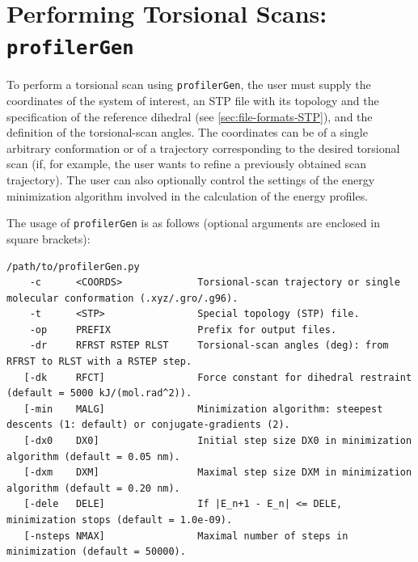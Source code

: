 \documentclass[10pt,a4paper,openany]{memoir}
\numberwithin{equation}{section}
\newcommand{\profilergen}[0]{\texttt{profilerGen}}
\begin{document}
\section{Performing Torsional Scans: \profilergen{}}
\label{sec:program-gen}

To perform a torsional scan using \profilergen{}, the user must supply
the coordinates of the system of interest, an STP file with its
topology and the specification of the reference dihedral (see
\autoref{sec:file-formats-STP}), and the definition of the
torsional-scan angles. The coordinates can be of a single arbitrary
conformation or of a trajectory corresponding to the desired torsional
scan (if, for example, the user wants to refine a previously obtained
scan trajectory). The user can also optionally control the settings of
the energy minimization algorithm involved in the calculation of the
energy profiles.

The usage of \profilergen{} is as follows (optional arguments are enclosed in square brackets):

\begin{lstlisting}
/path/to/profilerGen.py 
    -c      <COORDS>             Torsional-scan trajectory or single molecular conformation (.xyz/.gro/.g96).
    -t      <STP>                Special topology (STP) file.
    -op     PREFIX               Prefix for output files.
    -dr     RFRST RSTEP RLST     Torsional-scan angles (deg): from RFRST to RLST with a RSTEP step.
   [-dk     RFCT]                Force constant for dihedral restraint (default = 5000 kJ/(mol.rad^2)).
   [-min    MALG]                Minimization algorithm: steepest descents (1: default) or conjugate-gradients (2).
   [-dx0    DX0]                 Initial step size DX0 in minimization algorithm (default = 0.05 nm).
   [-dxm    DXM]                 Maximal step size DXM in minimization algorithm (default = 0.20 nm).
   [-dele   DELE]                If |E_n+1 - E_n| <= DELE, minimization stops (default = 1.0e-09).
   [-nsteps NMAX]                Maximal number of steps in minimization (default = 50000).
\end{lstlisting}\vspace{2ex} 
\end{document}
